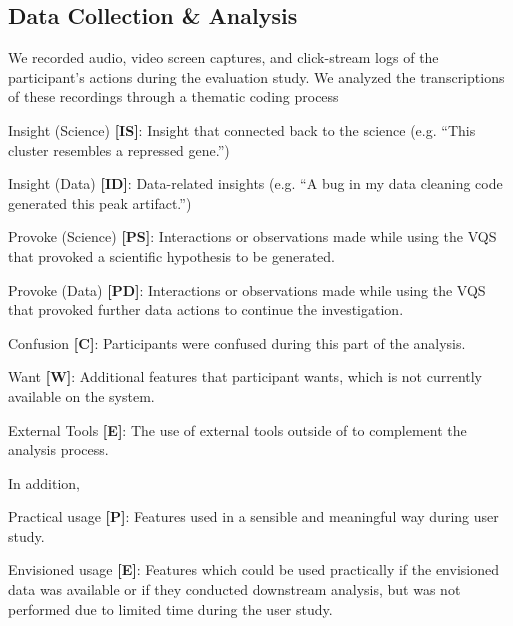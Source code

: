 \subsection{Data Collection \& Analysis}
We recorded audio, video screen captures, and click-stream logs of the participant's actions during the evaluation study. We analyzed the transcriptions of these recordings through a thematic coding process  
\begin{denselist}
    \item Insight (Science) \textbf{[IS]}: Insight that connected back to the science (e.g. ``This cluster resembles a repressed gene.'')
    \item Insight (Data) \textbf{[ID]}: Data-related insights (e.g. ``A bug in my data cleaning code generated this peak artifact.'')
    \item Provoke (Science) \textbf{[PS]}: Interactions or observations made while using the VQS that provoked a scientific hypothesis to be generated.
    \item Provoke (Data) \textbf{[PD]}: Interactions or observations made while using the VQS that provoked further data actions to continue the investigation.
    \item Confusion \textbf{[C]}: Participants were confused during this part of the analysis.
    \item Want \textbf{[W]}: Additional features that participant wants, which is not currently available on the system.
    \item External Tools \textbf{[E]}: The use of external tools outside of \zv to complement the analysis process.
\end{denselist}
\par In addition,  
\begin{denselist}
    \item Practical usage \textbf{[P]}: Features used in a sensible and meaningful way during user study.
    \item Envisioned usage \textbf{[E]}: Features which could be used practically if the envisioned data was available or if they conducted downstream analysis, but was not performed due to limited time during the user study. 
    \item {}
\end{denselist}

